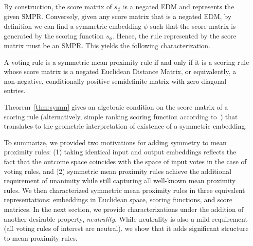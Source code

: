 \documentclass[prodmode,acmec]{ec-acmsmall}
\newcommand{\calL}{{\mathcal{L}}}
\newcommand{\rank}{{\calL(A)}}
\DeclareMathOperator*{\argmax}{arg\,max}
\DeclareMathOperator*{\argmin}{arg\,min}
\begin{document}
By construction, the score matrix of $s_{\phi}$ is a negated EDM and represents the given SMPR.  Conversely, given any score matrix that is a negated EDM, by definition we can find a symmetric embedding $\phi$ such that the score matrix is generated by the scoring function $s_{\phi}$. Hence, the rule represented by the score matrix must be an SMPR. This yields the following characterization. 
%
\begin{theorem}
A voting rule is a symmetric mean proximity rule if and only if it is a scoring rule whose score matrix is a negated Euclidean Distance Matrix, or equivalently, a non-negative, conditionally positive semidefinite matrix with zero diagonal entries.
\label{thm:symm}
\end{theorem}
%
Theorem~\ref{thm:symm} gives an algebraic condition on the score matrix of a scoring rule (alternatively, simple ranking scoring function according to~\cite{CRX09}) that translates to the geometric interpretation of existence of a symmetric embedding. 

To summarize, we provided two motivations for adding symmetry to mean proximity rules: (1) taking identical input and output embeddings reflects the fact that the outcome space coincides with the space of input votes in the case of voting rules, and (2) symmetric mean proximity rules achieve the additional requirement of unanimity while still capturing all well-known mean proximity rules. We then characterized symmetric mean proximity rules in three equivalent representations: embeddings in Euclidean space, scoring functions, and score matrices. In the next section, we provide characterizations under the addition of another desirable property, \emph{neutrality}. While neutrality is also a mild requirement (all voting rules of interest are neutral), we show that it adds significant structure to mean proximity rules. 
\end{document}
